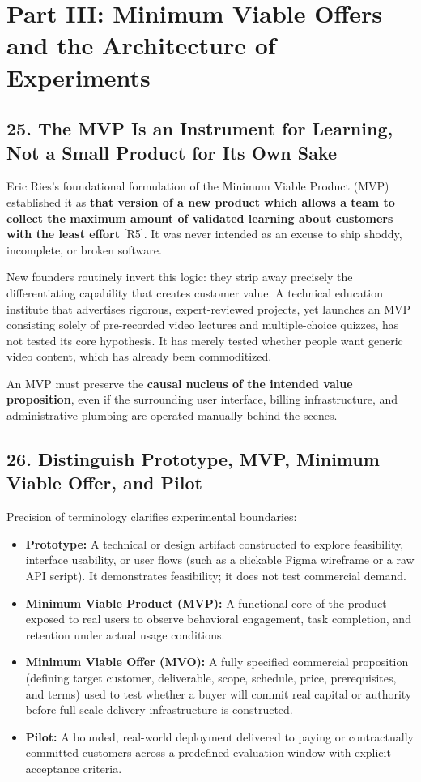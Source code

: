 \section*{Part III: Minimum Viable Offers and the Architecture of Experiments}

\subsection*{25. The MVP Is an Instrument for Learning, Not a Small Product for Its Own Sake}

Eric Ries's foundational formulation of the Minimum Viable Product (MVP) established it as \textbf{that version of a new product which allows a team to collect the maximum amount of validated learning about customers with the least effort} [R5]. It was never intended as an excuse to ship shoddy, incomplete, or broken software.

New founders routinely invert this logic: they strip away precisely the differentiating capability that creates customer value. A technical education institute that advertises rigorous, expert-reviewed projects, yet launches an MVP consisting solely of pre-recorded video lectures and multiple-choice quizzes, has not tested its core hypothesis. It has merely tested whether people want generic video content, which has already been commoditized.

An MVP must preserve the \textbf{causal nucleus of the intended value proposition}, even if the surrounding user interface, billing infrastructure, and administrative plumbing are operated manually behind the scenes.

\subsection*{26. Distinguish Prototype, MVP, Minimum Viable Offer, and Pilot}

Precision of terminology clarifies experimental boundaries:

\begin{itemize}
    \item \textbf{Prototype:} A technical or design artifact constructed to explore feasibility, interface usability, or user flows (such as a clickable Figma wireframe or a raw API script). It demonstrates feasibility; it does not test commercial demand.
    \item \textbf{Minimum Viable Product (MVP):} A functional core of the product exposed to real users to observe behavioral engagement, task completion, and retention under actual usage conditions.
    \item \textbf{Minimum Viable Offer (MVO):} A fully specified commercial proposition (defining target customer, deliverable, scope, schedule, price, prerequisites, and terms) used to test whether a buyer will commit real capital or authority before full-scale delivery infrastructure is constructed.
    \item \textbf{Pilot:} A bounded, real-world deployment delivered to paying or contractually committed customers across a predefined evaluation window with explicit acceptance criteria.
\end{itemize}


